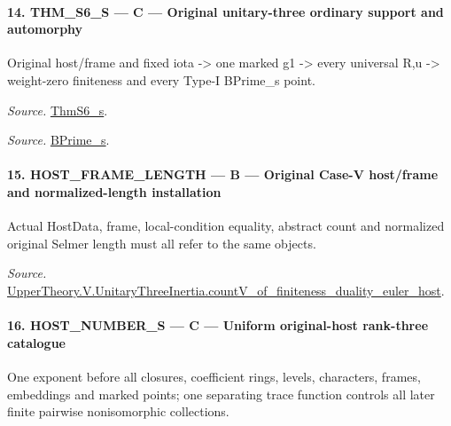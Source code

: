 \documentclass[11pt,a4paper]{article}
\numberwithin{equation}{section}
\theoremstyle{remark}\newtheorem{remark}[theorem]{Remark}
\begin{document}
\paragraph{14. THM\_\allowbreak S6\_\allowbreak S — C — Original unitary-three ordinary support and automorphy}

Original host/frame and fixed iota -> one marked g1 -> every universal R,u -> weight-zero finiteness and every Type-I BPrime\_\allowbreak s point.

\emph{Source.} \href{https://github.com/CocoSgt/riemann-hypothesis-lean/blob/7cbf7a0c32fca1badf05931879a37c3f8a2b03b4/src/Development/AutomorphicArithmetic/AutomorphicVarieties/ModularityArgument/ThresholdArguments/DenseThresholdCases/ThmS6CoreS.lean#L17-L26}{ThmS6\_\allowbreak s}.

\emph{Source.} \href{https://github.com/CocoSgt/riemann-hypothesis-lean/blob/7cbf7a0c32fca1badf05931879a37c3f8a2b03b4/src/Development/AutomorphicArithmetic/AutomorphicVarieties/ModularityArgument/ThresholdArguments/DenseThresholdCases/ThmS6CoreS.lean#L12-L16}{BPrime\_\allowbreak s}.



\paragraph{15. HOST\_\allowbreak FRAME\_\allowbreak LENGTH — B — Original Case-V host/frame and normalized-length installation}

Actual HostData, frame, local-condition equality, abstract count and normalized original Selmer length must all refer to the same objects.

\emph{Source.} \href{https://github.com/CocoSgt/riemann-hypothesis-lean/blob/7cbf7a0c32fca1badf05931879a37c3f8a2b03b4/src/Development/AutomorphicArithmetic/AutomorphicVarieties/ModularityArgument/ThresholdArguments/DenseThresholdCases/CountVOf.lean#L33-L60}{UpperTheory.V.UnitaryThreeInertia.countV\_\allowbreak of\_\allowbreak finiteness\_\allowbreak duality\_\allowbreak euler\_\allowbreak host}.



\paragraph{16. HOST\_\allowbreak NUMBER\_\allowbreak S — C — Uniform original-host rank-three catalogue}

One exponent before all closures, coefficient rings, levels, characters, frames, embeddings and marked points; one separating trace function controls all later finite pairwise nonisomorphic collections.
\end{document}
